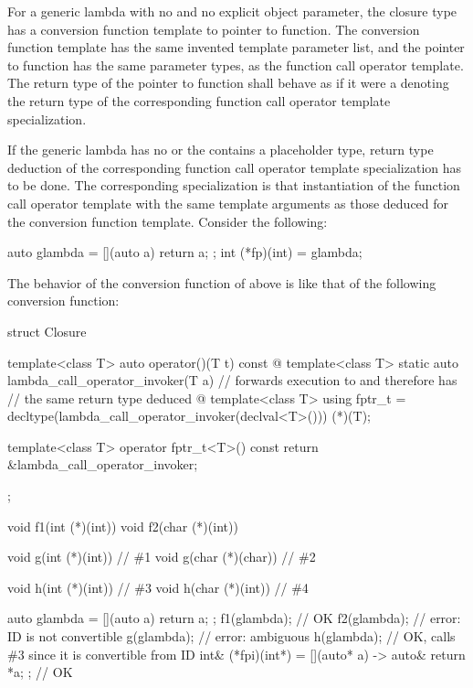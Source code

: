 \pnum
For a generic lambda with no 
and no explicit object parameter,
the closure type has a
conversion function template to
pointer to function. The conversion function template has the same invented
template parameter list, and the pointer to function has the same
parameter types, as the function call operator template.  The return type of
the pointer to function shall behave as if it were a
 denoting the return type of the corresponding
function call operator template specialization.

\pnum
\begin{note}
If the generic lambda has no  or
the  contains a placeholder type, return type
deduction of the corresponding function call operator template specialization
has to be done. The corresponding specialization is that instantiation of the
function call operator template with the same template arguments as those
deduced for the conversion function template.  Consider the following:
\begin{codeblock}
auto glambda = [](auto a) { return a; };
int (*fp)(int) = glambda;
\end{codeblock}
The behavior of the conversion function of  above is like
that of the following conversion function:
\begin{codeblock}
struct Closure {
  template<class T> auto operator()(T t) const { @\commentellip@ }
  template<class T> static auto lambda_call_operator_invoker(T a) {
    // forwards execution to  and therefore has
    // the same return type deduced
    @\commentellip@
  }
  template<class T> using fptr_t =
    decltype(lambda_call_operator_invoker(declval<T>())) (*)(T);

  template<class T> operator fptr_t<T>() const
    { return &lambda_call_operator_invoker; }
};
\end{codeblock}
\end{note}

\begin{example}
\begin{codeblock}
void f1(int (*)(int))   { }
void f2(char (*)(int))  { }

void g(int (*)(int))    { }     // \#1
void g(char (*)(char))  { }     // \#2

void h(int (*)(int))    { }     // \#3
void h(char (*)(int))   { }     // \#4

auto glambda = [](auto a) { return a; };
f1(glambda);                    // OK
f2(glambda);                    // error: ID is not convertible
g(glambda);                     // error: ambiguous
h(glambda);                     // OK, calls \#3 since it is convertible from ID
int& (*fpi)(int*) = [](auto* a) -> auto& { return *a; };        // OK
\end{codeblock}
\end{example}


